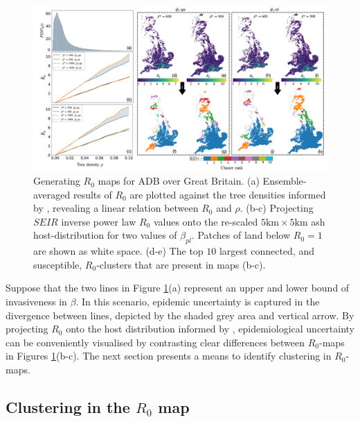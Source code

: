 \begin{landscape}
\begin{figure}
    \centering
    \includegraphics[scale=0.38]{chapter6/figures/fig6-R0-map-generation.pdf}
    \caption{Generating $R_0$ maps for ADB over Great Britain. (a) Ensemble-averaged results of $R_0$ are plotted against the tree densities informed by \cite{hill.data}, revealing a linear relation between $R_0$ and $\rho$. (b-c) Projecting $SEIR$ inverse power law $R_0$ values onto the re-scaled $5\mathrm{km} \times 5 \mathrm{km}$ ash host-distribution for two values of $\beta_{pl}$. Patches of land below $R_0 = 1$ are shown as white space. (d-e) The top $10$ largest connected, and susceptible, $R_0$-clusters that are present in maps (b-c).}
    \label{fig:R0-map-generation}
\end{figure}
\end{landscape}

Suppose that the two lines in Figure \ref{fig:R0-map-generation}(a) represent an upper and lower bound of invasiveness in $\beta$. 
In this scenario, epidemic uncertainty is captured in the divergence between lines, depicted by the shaded grey area and vertical arrow. 
By projecting $R_0$ onto the host distribution informed by \cite{hill.data}, epidemiological uncertainty can be conveniently visualised by contrasting clear differences between $R_0$-maps in Figures \ref{fig:R0-map-generation}(b-c). 
The next section presents a means to identify clustering in $R_0$-maps.


\subsection{Clustering in the $R_0$ map}

